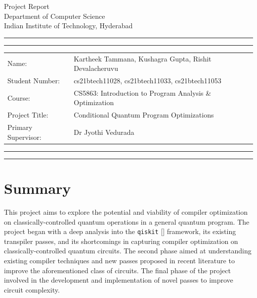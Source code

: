 \documentclass[10pt]{article}
\newcommand{\studentname}{Kartheek Tammana, Kushagra Gupta, Rishit Devalacheruvu}
\newcommand{\studentnumber}{cs21btech11028, cs21btech11033, cs21btech11053}
\newcommand{\researchcentre}{CS5863: Introduction to Program Analysis \& Optimization}
\newcommand{\projecttitle}{Conditional Quantum Program Optimizations}
\newcommand{\supervisor}{Dr Jyothi Vedurada}
\begin{document}
\begin{center}
{\Huge{Project Report}} \\
\vspace{2mm}
{\Large{Department of Computer Science}} \\
\vspace{1mm}
{\Large{Indian Institute of Technology, Hyderabad}} \\
\end{center}

\vspace{5mm}
\hrule
\vspace{1mm}
\hrule

\vspace{3mm}
\begin{tabular}{ll} 
Name:           	        & {\studentname}   \\ 
Student Number: 	        & {\studentnumber} \\ 
Course: 	                & {\researchcentre}  \\ 
Project Title: 	          & {\projecttitle}  \\ 
Primary Supervisor: 	    & {\supervisor}  \\ 
\end{tabular}

\vspace{3mm}
\hrule
\vspace{1mm}
\hrule

\section{Summary}
This project aims to explore the potential and viability of compiler optimization on classically-controlled quantum operations in a general quantum program. The project began with a deep analysis into the \texttt{qiskit} [\cite{qiskit2024}] framework, its existing transpiler passes, and its shortcomings in capturing compiler optimization on classically-controlled quantum circuits. The second phase aimed at understanding existing compiler techniques and new passes proposed in recent literature to improve the aforementioned class of circuits. The final phase of the project involved in the development and implementation of novel passes to improve circuit complexity.

\end{document}
